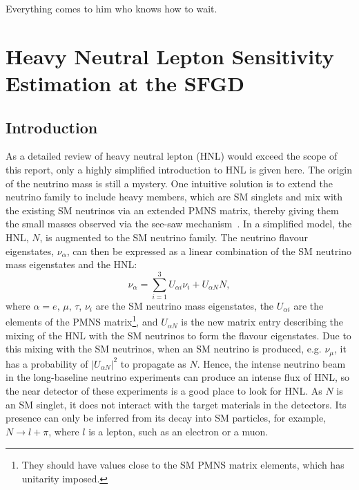 \begin{savequote}[8cm]
Everything comes to him who knows how to wait.

\end{savequote}

\chapter{\label{ch:hnl}Heavy Neutral Lepton Sensitivity Estimation at the SFGD} 

\minitoc

    \section{Introduction}
        As a detailed review of heavy neutral lepton (HNL) would exceed the scope of this report, only a highly simplified introduction to HNL is given here. 
        The origin of the neutrino mass is still a mystery. 
        One intuitive solution is to extend the neutrino family to include heavy members, which are SM singlets and mix with the existing SM neutrinos via an extended PMNS matrix, thereby giving them the small masses observed via the see-saw mechanism~\cite{Abada:2007ux}. 
        In a simplified model, the HNL, $N$, is augmented to the SM neutrino family. 
        The neutrino flavour eigenstates, $\nu_\alpha$, can then be expressed as a linear combination of the SM neutrino mass eigenstates and the HNL:
        \begin{equation}
            \nu_\alpha = \sum_{i=1}^3 U_{\alpha i} \nu_i + U_{\alpha N} N,
        \end{equation}
        where $\alpha=e,\,\mu,\,\tau$, $\nu_i$ are the SM neutrino mass eigenstates, the $U_{\alpha i}$ are the elements of the PMNS matrix\footnote{They should have values close to the SM PMNS matrix elements, which has unitarity imposed.}, and $U_{\alpha N}$ is the new matrix entry describing the mixing of the HNL with the SM neutrinos to form the flavour eigenstates. 
        Due to this mixing with the SM neutrinos, when an SM neutrino is produced, e.g. $\nu_\mu$, it has a probability of $|U_{\alpha N}|^2$ to propagate as $N$.
        Hence, the intense neutrino beam in the long-baseline neutrino experiments can produce an intense flux of HNL, so the near detector of these experiments is a good place to look for HNL. 
        As $N$ is an SM singlet, it does not interact with the target materials in the detectors. 
        Its presence can only be inferred from its decay into SM particles, for example, $N\rightarrow l + \pi$, where $l$ is a lepton, such as an electron or a muon.
